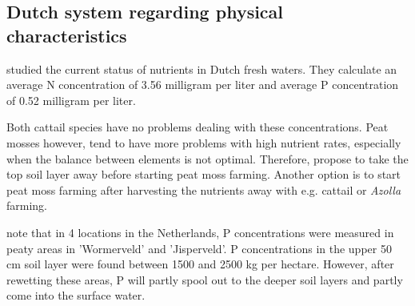 \documentclass[12pt,a4paper,titlepage]{article}
\begin{document}



\subsection{Dutch system regarding physical characteristics}

\citet{van2010nutrienten} studied the current status of nutrients in Dutch fresh waters. They calculate an average N concentration of 3.56 milligram per liter and average P concentration of 0.52 milligram per liter. 

Both cattail species have no problems dealing with these concentrations. Peat mosses however, tend to have more problems with high nutrient rates, especially when the balance between elements is not optimal. Therefore, \citet{harpenslager2015rewetting} propose to take the top soil layer away before starting peat moss farming. Another option is to start peat moss farming after harvesting the nutrients away with e.g. cattail or \textit{Azolla} farming.

\citet{smolders2013waterkwaliteit} note that in 4 locations in the Netherlands, P concentrations were measured in peaty areas in 'Wormerveld' and 'Jisperveld'. P concentrations in the upper 50 cm soil layer were found between 1500 and 2500 kg per hectare. However, after rewetting these areas, P will partly spool out to the deeper soil layers and partly come into the surface water.





\end{document}

